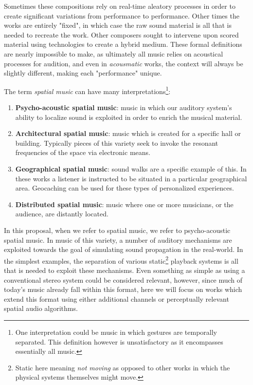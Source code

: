 Sometimes these compositions rely on real-time aleatory processes in order to create significant variations from performance to performance. Other times the works are entirely "fixed", in which case the raw sound material is all that is needed to recreate the work. Other composers sought to intervene upon scored material using technologies to create a hybrid medium. These formal definitions are nearly impossible to make, as ultimately all music relies on acoustical processes for audition, and even in \textit{acousmatic} works, the context will always be slightly different, making each "performance" unique.

The term \textit{spatial music} can have many interpretations\footnote{One interpretation could be music in which gestures are temporally separated. This definition however is unsatisfactory as it encompasses essentially all music.}:
\begin{enumerate}
    \item \textbf{Psycho-acoustic spatial music}: music in which our auditory system's ability to localize sound is exploited in order to enrich the musical material. 
    \item \textbf{Architectural spatial music}: music which is created for a specific hall or building. Typically pieces of this variety seek to invoke the resonant frequencies of the space via electronic means. 
    \item \textbf{Geographical spatial music}: sound walks are a specific example of this. In these works a listener is instructed to be situated in a particular geographical area. Geocaching can be used for these types of personalized experiences.
    \item \textbf{Distributed spatial music}: music where one or more musicians, or the audience, are distantly located. 
\end{enumerate}

In this proposal, when we refer to spatial music, we refer to psycho-acoustic spatial music. In music of this variety, a number of auditory mechanisms are exploited towards the goal of simulating sound propagation in the real-world. In the simplest examples, the separation of various static\footnote{Static here meaning \textit{not moving} as opposed to other works in which the physical systems themselves might move.} playback systems is all that is needed to exploit these mechanisms. Even something as simple as using a conventional stereo system could be considered relevant, however, since much of today's music already fall within this format, here we will focus on works which extend this format using either additional channels or perceptually relevant spatial audio algorithms. 

